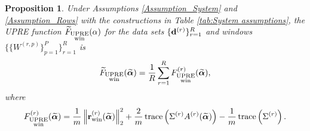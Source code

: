 \documentclass[12pt]{article}
\newtheorem{proposition}{Proposition}[section]
\begin{document}
\begin{proposition}
\label{prop:Main UPRE Result}
Under Assumptions \ref{Assumption_System} and \ref{Assumption_Rows} with the constructions in Table \ref{tab:System assumptions}, the UPRE function $\widetilde{F}_{\substack{\text{UPRE} \\ \text{win}}}(\alpha)$ for the data sets $\{\mathbf{d}^{(r)}\}_{r=1}^R$ and windows $\{\{W^{(r,p)}\}_{p=1}^P\}_{r=1}^R$ is
\begin{equation}
\label{eq:Averaged UPRE}
\widetilde{F}_{\substack{\text{UPRE} \\ \text{win}}}(\widetilde{\bm{\alpha}}) = \frac{1}{R} \sum_{r=1}^R F_{\substack{\text{UPRE} \\ \text{win}}}^{(r)}(\widetilde{\bm{\alpha}}),
\end{equation}
where
\begin{equation}
\label{eq:Individual UPRE}
F_{\substack{\text{UPRE} \\ \text{win}}}^{(r)}(\widetilde{\bm{\alpha}}) = \frac{1}{m}\left\|\mathbf{r}_{\text{win}}^{(r)}(\widetilde{\bm{\alpha}})\right\|_2^2 + \frac{2}{m} \operatorname{trace}\left(\Sigma^{(r)} A^{(r)}(\widetilde{\bm{\alpha}})\right) - \frac{1}{m} \operatorname{trace}\left(\Sigma^{(r)}\right).
\end{equation}
\end{proposition}
\end{document}
